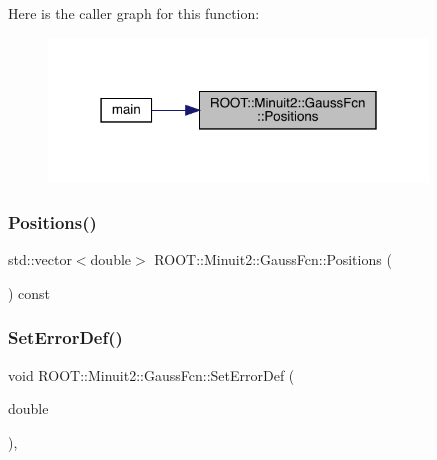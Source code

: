 Here is the caller graph for this function\+:
\nopagebreak
\begin{figure}[H]
\begin{center}
\leavevmode
\includegraphics[width=286pt]{de/dc1/classROOT_1_1Minuit2_1_1GaussFcn_a7098b4a70f063917479335d5f1d7473a_icgraph}
\end{center}
\end{figure}
\mbox{\label{classROOT_1_1Minuit2_1_1GaussFcn_a7098b4a70f063917479335d5f1d7473a}} 
\subsubsection{\texorpdfstring{Positions()}{Positions()}\hspace{0.1cm}{\footnotesize\ttfamily [2/2]}}
{\footnotesize\ttfamily std\+::vector$<$double$>$ R\+O\+O\+T\+::\+Minuit2\+::\+Gauss\+Fcn\+::\+Positions (\begin{DoxyParamCaption}{ }\end{DoxyParamCaption}) const\hspace{0.3cm}{\ttfamily [inline]}}

\mbox{\label{classROOT_1_1Minuit2_1_1GaussFcn_ad6ab65c15a43f72db27fd6ddf26486f9}} 
\subsubsection{\texorpdfstring{SetErrorDef()}{SetErrorDef()}\hspace{0.1cm}{\footnotesize\ttfamily [1/2]}}
{\footnotesize\ttfamily void R\+O\+O\+T\+::\+Minuit2\+::\+Gauss\+Fcn\+::\+Set\+Error\+Def (\begin{DoxyParamCaption}\item[{double}]{ }\end{DoxyParamCaption})\hspace{0.3cm}{\ttfamily [inline]}, {\ttfamily [virtual]}}

